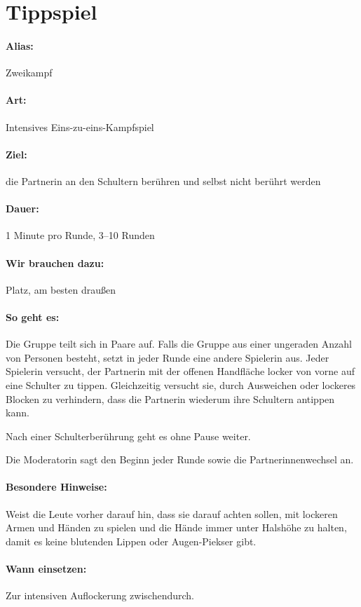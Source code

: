 \section{Tippspiel}
\paragraph{Alias:} Zweikampf
\paragraph{Art:} Intensives Eins-zu-eins-Kampfspiel
\paragraph{Ziel:} die Partnerin an den Schultern berühren und selbst nicht berührt werden
\paragraph{Dauer:} 1 Minute pro Runde, 3--10 Runden
\paragraph{Wir brauchen dazu:} Platz, am besten draußen
\paragraph{So geht es:} Die Gruppe teilt sich in Paare auf. Falls die Gruppe aus einer ungeraden Anzahl von Personen besteht, setzt in jeder Runde eine andere Spielerin aus. Jeder Spielerin versucht, der Partnerin mit der offenen Handfläche locker von vorne auf eine Schulter zu tippen. Gleichzeitig versucht sie, durch Ausweichen oder lockeres Blocken zu verhindern, dass die Partnerin wiederum ihre Schultern antippen kann.

Nach einer Schulterberührung geht es ohne Pause weiter.

Die Moderatorin sagt den Beginn jeder Runde sowie die Partnerinnenwechsel an.
\paragraph{Besondere Hinweise:} Weist die Leute vorher darauf hin, dass sie darauf achten sollen, mit lockeren Armen und Händen zu spielen und die Hände immer unter Halshöhe zu halten, damit es keine blutenden Lippen oder Augen-Piekser gibt.
\paragraph{Wann einsetzen:} Zur intensiven Auflockerung zwischendurch.
